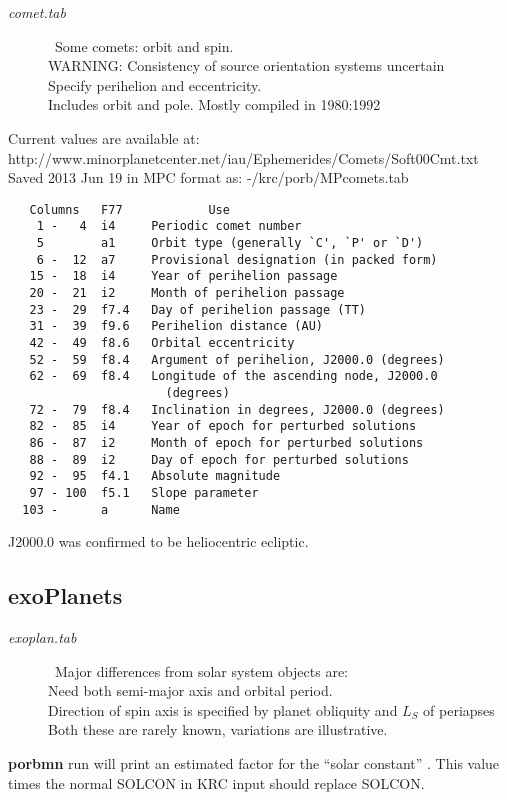 \documentclass[draft]{article}  %
\newcommand{\np}{\textbf}  %
\newcommand{\qi}{\\ \hspace*{2.em}}      %
\newcommand{\qii}{\\ \hspace*{4.em}}     %
\newcommand{\qiii}{\\ \hspace*{6.em}}    %
\begin{document}
\begin{description} 
 \item [\textit{comet.tab}] \  Some comets: orbit and spin. 
\\ WARNING: Consistency of source orientation systems uncertain
\qi Specify perihelion and eccentricity.
\\ Includes orbit and pole. Mostly compiled in 1980:1992
\end{description}
Current values are available at: 
\qi http://www.minorplanetcenter.net/iau/Ephemerides/Comets/Soft00Cmt.txt
\qii Saved 2013 Jun 19 in MPC format as: -/krc/porb/MPcomets.tab
\vspace{-6.mm}
\begin{verbatim}
   Columns   F77            Use
    1 -   4  i4     Periodic comet number
    5        a1     Orbit type (generally `C', `P' or `D')
    6 -  12  a7     Provisional designation (in packed form)
   15 -  18  i4     Year of perihelion passage
   20 -  21  i2     Month of perihelion passage
   23 -  29  f7.4   Day of perihelion passage (TT)
   31 -  39  f9.6   Perihelion distance (AU)
   42 -  49  f8.6   Orbital eccentricity
   52 -  59  f8.4   Argument of perihelion, J2000.0 (degrees)
   62 -  69  f8.4   Longitude of the ascending node, J2000.0
                      (degrees)
   72 -  79  f8.4   Inclination in degrees, J2000.0 (degrees)
   82 -  85  i4     Year of epoch for perturbed solutions
   86 -  87  i2     Month of epoch for perturbed solutions
   88 -  89  i2     Day of epoch for perturbed solutions
   92 -  95  f4.1   Absolute magnitude
   97 - 100  f5.1   Slope parameter
  103 -      a      Name
\end{verbatim}
J2000.0 was confirmed to be heliocentric ecliptic.

\subsection{exoPlanets} %

\begin{description} 
\item [\textit{exoplan.tab}] \ Major differences from solar system objects are:
\qi Need both semi-major axis and orbital period.
\qi Direction of spin axis is specified by planet obliquity and $L_S$ of periapses
\qiii Both these are rarely known, variations are illustrative.
\end{description}

\np{porbmn} run will print an estimated factor for the ``solar constant'' . This value times the normal SOLCON in KRC input should replace SOLCON.
\end{document}
